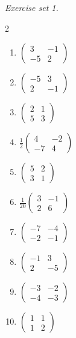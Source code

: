 \par\noindent\emph{Exercise set 1.}\nopagebreak
\begin{multicols}{2}\raggedright
\begin{enumerate}[label=\arabic*., leftmargin=*, itemsep=1pt]
\item $\left(\begin{smallmatrix}3 & -1\\ -5 & 2\end{smallmatrix}\right)$
\item $\left(\begin{smallmatrix}-5 & 3\\ 2 & -1\end{smallmatrix}\right)$
\item $\left(\begin{smallmatrix}2 & 1\\ 5 & 3\end{smallmatrix}\right)$
\item $\frac{1}{2}\left(\begin{smallmatrix}4 & -2\\ -7 & 4\end{smallmatrix}\right)$
\item $\left(\begin{smallmatrix}5 & 2\\ 3 & 1\end{smallmatrix}\right)$
\item $\frac{1}{20}\left(\begin{smallmatrix}3 & -1\\ 2 & 6\end{smallmatrix}\right)$
\item $\left(\begin{smallmatrix}-7 & -4\\ -2 & -1\end{smallmatrix}\right)$
\item $\left(\begin{smallmatrix}-1 & 3\\ 2 & -5\end{smallmatrix}\right)$
\item $\left(\begin{smallmatrix}-3 & -2\\ -4 & -3\end{smallmatrix}\right)$
\item $\left(\begin{smallmatrix}1 & 1\\ 1 & 2\end{smallmatrix}\right)$

\end{enumerate}
\end{multicols}
